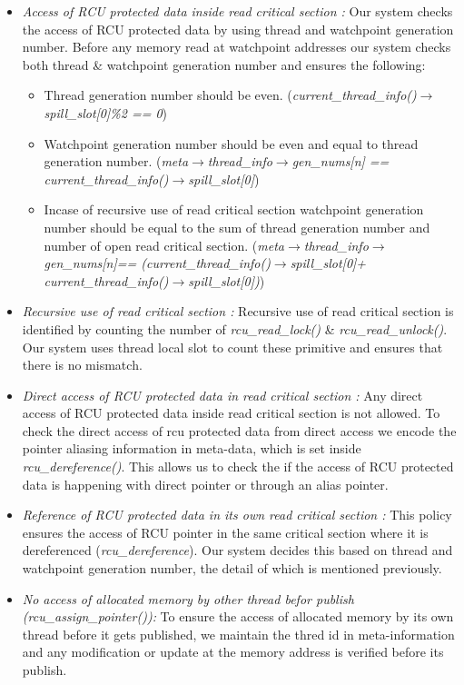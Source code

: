 \begin {itemize} 
	\item \emph{Access of RCU protected data inside read critical section :} Our system checks the access of RCU protected data by using thread and watchpoint generation number. Before any memory read at watchpoint addresses our system checks both thread \& watchpoint generation number and ensures the following:
	\begin {itemize}
		\item Thread generation number should be even. (\emph{current\_thread\_info()$\rightarrow$spill\_slot[0]\%2 == 0})
		\item Watchpoint generation number should be even and equal to thread generation number. (\emph{meta$\rightarrow$thread\_info$\rightarrow$gen\_nums[n] == current\_thread\_info()$\rightarrow$spill\_slot[0]}) 
		\item Incase of recursive use of read critical section watchpoint generation number should be equal to the sum of thread generation number and number of open read critical section. (\emph{meta$\rightarrow$thread\_info$\rightarrow$gen\_nums[n]== (current\_thread\_info()$\rightarrow$spill\_slot[0]+ current\_thread\_info()$\rightarrow$spill\_slot[0])})
	\end{itemize}	  

	\item \emph{Recursive use of read critical section :} Recursive use of read critical section is identified by counting the number of  \emph{rcu\_read\_lock()}  \& \emph{rcu\_read\_unlock()}. Our system uses thread local slot to count these primitive and ensures that there is no mismatch.

	\item \emph{ Direct access of RCU protected data in read critical section :} Any direct access of RCU protected data inside read critical section is not allowed. To check the direct access of rcu protected data from direct access we encode the pointer aliasing information in meta-data, which is set inside \emph{rcu\_dereference()}. This allows us to check the if the access of RCU protected data is happening with direct pointer or through an alias pointer.

	\item \emph{ Reference of RCU protected data in its own read critical section :} This policy ensures the access of RCU pointer in the same critical section where it is dereferenced (\emph{rcu\_dereference}). Our system decides this based on thread and watchpoint generation number, the detail of which is mentioned previously.  

	\item \emph{ No access of allocated memory by other thread befor publish (\emph{rcu\_assign\_pointer()}):} To ensure the access of allocated memory by its own thread before it gets published, we maintain the thred id in meta-information and any modification or update at the memory address is verified before its publish.
\end{itemize}

